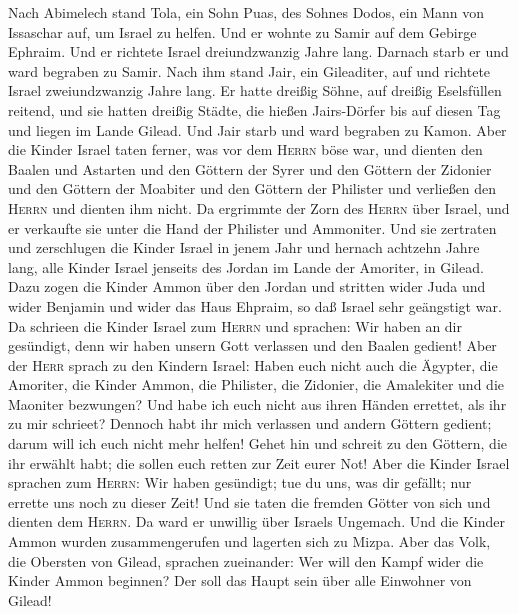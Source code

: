  Nach Abimelech stand Tola, ein Sohn Puas, des Sohnes
Dodos, ein Mann von Issaschar auf, um Israel zu helfen. Und er wohnte zu
Samir auf dem Gebirge Ephraim.  Und er richtete Israel
dreiundzwanzig Jahre lang. Darnach starb er und ward begraben zu Samir.
 Nach ihm stand Jair, ein Gileaditer, auf und richtete
Israel zweiundzwanzig Jahre lang.  Er hatte dreißig Söhne,
auf dreißig Eselsfüllen reitend, und sie hatten dreißig Städte, die
hießen Jairs-Dörfer bis auf diesen Tag und liegen im Lande Gilead.
 Und Jair starb und ward begraben zu Kamon. 
Aber die Kinder Israel taten ferner, was vor dem \textsc{Herrn} böse
war, und dienten den Baalen und Astarten und den Göttern der Syrer und
den Göttern der Zidonier und den Göttern der Moabiter und den Göttern
der Philister und verließen den \textsc{Herrn} und dienten ihm nicht.
 Da ergrimmte der Zorn des \textsc{Herrn} über Israel, und
er verkaufte sie unter die Hand der Philister und Ammoniter.
 Und sie zertraten und zerschlugen die Kinder Israel in
jenem Jahr und hernach achtzehn Jahre lang, alle Kinder Israel jenseits
des Jordan im Lande der Amoriter, in Gilead.  Dazu zogen
die Kinder Ammon über den Jordan und stritten wider Juda und wider
Benjamin und wider das Haus Ehpraim, so daß Israel sehr geängstigt war.
 Da schrieen die Kinder Israel zum \textsc{Herrn} und
sprachen: Wir haben an dir gesündigt, denn wir haben unsern Gott
verlassen und den Baalen gedient!  Aber der \textsc{Herr}
sprach zu den Kindern Israel: Haben euch nicht auch die Ägypter, die
Amoriter, die Kinder Ammon, die Philister, die Zidonier, 
die Amalekiter und die Maoniter bezwungen? Und habe ich euch nicht aus
ihren Händen errettet, als ihr zu mir schrieet?  Dennoch
habt ihr mich verlassen und andern Göttern gedient; darum will ich euch
nicht mehr helfen!  Gehet hin und schreit zu den Göttern,
die ihr erwählt habt; die sollen euch retten zur Zeit eurer Not!
 Aber die Kinder Israel sprachen zum \textsc{Herrn}: Wir
haben gesündigt; tue du uns, was dir gefällt; nur errette uns noch zu
dieser Zeit!  Und sie taten die fremden Götter von sich
und dienten dem \textsc{Herrn}. Da ward er unwillig über Israels
Ungemach.  Und die Kinder Ammon wurden zusammengerufen
und lagerten sich zu Mizpa.  Aber das Volk, die Obersten
von Gilead, sprachen zueinander: Wer will den Kampf wider die Kinder
Ammon beginnen? Der soll das Haupt sein über alle Einwohner von Gilead!

